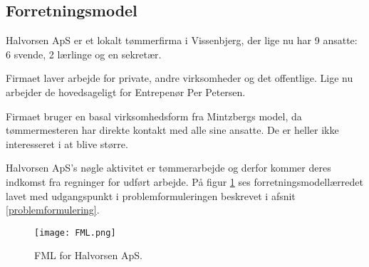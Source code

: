 \subsection{Forretningsmodel}

Halvorsen ApS er et lokalt tømmerfirma i Vissenbjerg, der lige nu har 9 ansatte: 6 svende, 2 lærlinge og en sekretær.

Firmaet laver arbejde for private, andre virksomheder og det offentlige.
Lige nu arbejder de hovedsageligt for Entrepenør Per Petersen.

Firmaet bruger en basal virksomhedsform fra Mintzbergs model, da tømmermesteren har direkte kontakt med alle sine ansatte. De er heller ikke interesseret i at blive større.\cite{organisation}

Halvorsen ApS's nøgle aktivitet er tømmerarbejde og derfor kommer deres indkomst fra regninger for udført arbejde.
På figur \ref{forretningsmodelfigur} ses forretningsmodellærredet lavet med udgangspunkt i problemformuleringen beskrevet i afsnit \ref{problemformulering}.

\begin{figure} 
    \caption{FML for Halvorsen ApS.}
    \centering
    \texttt{[image: FML.png]}
    \label{forretningsmodelfigur}
\end{figure}
